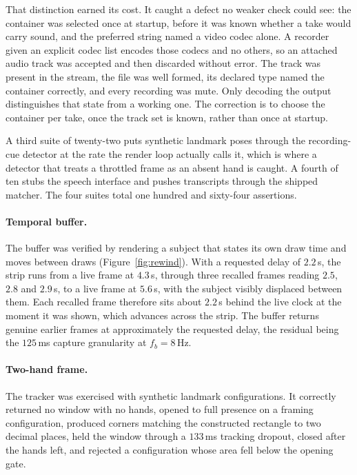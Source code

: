 \documentclass{article}
\theoremstyle{definition}
\begin{document}
That distinction earned its cost. It caught a defect no weaker check could see:
the container was selected once at startup, before it was known whether a take
would carry sound, and the preferred string named a video codec alone. A recorder
given an explicit codec list encodes those codecs and no others, so an attached
audio track was accepted and then discarded without error. The track was present
in the stream, the file was well formed, its declared type named the container
correctly, and every recording was mute. Only decoding the output distinguishes
that state from a working one. The correction is to choose the container per
take, once the track set is known, rather than once at startup.

A third suite of twenty-two puts synthetic landmark poses through the
recording-cue detector at the rate the render loop actually calls it, which is
where a detector that treats a throttled frame as an absent hand is caught. A
fourth of ten stubs the speech interface and pushes transcripts through the
shipped matcher. The four suites total one hundred and sixty-four assertions.

\paragraph{Temporal buffer.}
The buffer was verified by rendering a subject that states its own draw time and
moves between draws (Figure~\ref{fig:rewind}). With a requested delay of
$2.2$\,s, the strip runs from a live frame at $4.3$\,s, through three recalled
frames reading $2.5$, $2.8$ and $2.9$\,s, to a live frame at $5.6$\,s, with the
subject visibly displaced between them. Each recalled frame therefore sits about
$2.2$\,s behind the live clock at the moment it was shown, which advances across
the strip. The buffer returns genuine earlier frames at approximately the
requested delay, the residual being the $125$\,ms capture granularity at
$f_b = 8$\,Hz.

\paragraph{Two-hand frame.}
The tracker was exercised with synthetic landmark configurations. It correctly
returned no window with no hands, opened to full presence on a framing
configuration, produced corners matching the constructed rectangle to two decimal
places, held the window through a $133$\,ms tracking dropout, closed after the
hands left, and rejected a configuration whose area fell below the opening gate.
\end{document}
